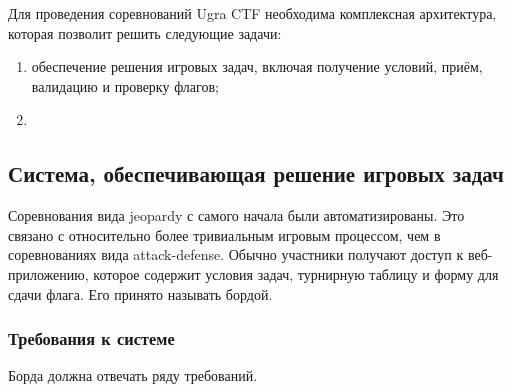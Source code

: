 Для проведения соревнований Ugra CTF необходима комплексная архитектура, которая позволит решить следующие задачи:

\begin{enumerate}

\item обеспечение решения игровых задач, включая получение условий, приём, валидацию и проверку флагов;
\item

\end{enumerate}


\subsection{Система, обеспечивающая решение игровых задач}

Соревнования вида jeopardy с самого начала были автоматизированы. Это связано с относительно более тривиальным игровым процессом, чем в соревнованиях вида attack-defense. Обычно участники получают доступ к веб-приложению, которое содержит условия задач, турнирную таблицу и форму для сдачи флага. Его принято называть бордой.



\subsubsection{Требования к системе}

Борда должна отвечать ряду требований.

